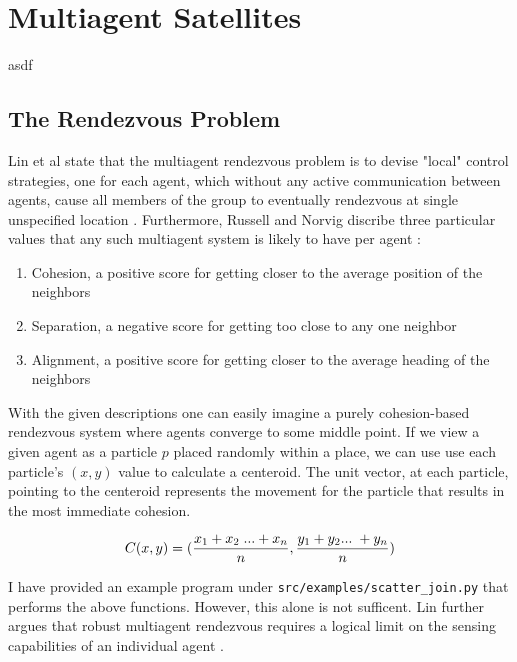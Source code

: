 \documentclass[journal,a4paper]{IEEEtran}
\begin{document}
%
%
\section{Multiagent Satellites}
asdf

\subsection{The Rendezvous Problem}
Lin et al state that the multiagent rendezvous problem is to devise "local" control
strategies, one for each agent, which without any active communication between agents,
cause all members of the group to eventually rendezvous at single unspecified location \cite{lin_multi}.
Furthermore, Russell and Norvig discribe three particular values that any such multiagent
system is likely to have per agent \cite{class_book}:

\begin{enumerate}
  \item Cohesion, a positive score for getting closer to the average position of the neighbors
  \item Separation, a negative score for getting too close to any one neighbor
  \item Alignment, a positive score for getting closer to the average heading of the neighbors
\end{enumerate}

With the given descriptions one can easily imagine a purely cohesion-based rendezvous
system where agents converge to some middle point. If we view a given agent as a
particle $p$ placed randomly within a place, we can use use each particle's $(x,y)$
value to calculate a centeroid. The unit vector, at each particle, pointing to the
centeroid represents the movement for the particle that results in the most immediate
cohesion.

\begin{equation}
  C(x,y) = (\frac{x_1 + x_2 \hspace{1mm} ... + x_n}{n} , \frac{y_1 + y_2 ... \hspace{1mm} + y_n}{n})
\end{equation}

I have provided an example program under \texttt{src/examples/scatter\_join.py} that
performs the above functions. However, this alone is not sufficent. Lin further argues
that robust multiagent rendezvous requires a logical limit on the sensing capabilities
of an individual agent \cite{lin_multi}.
\end{document}
